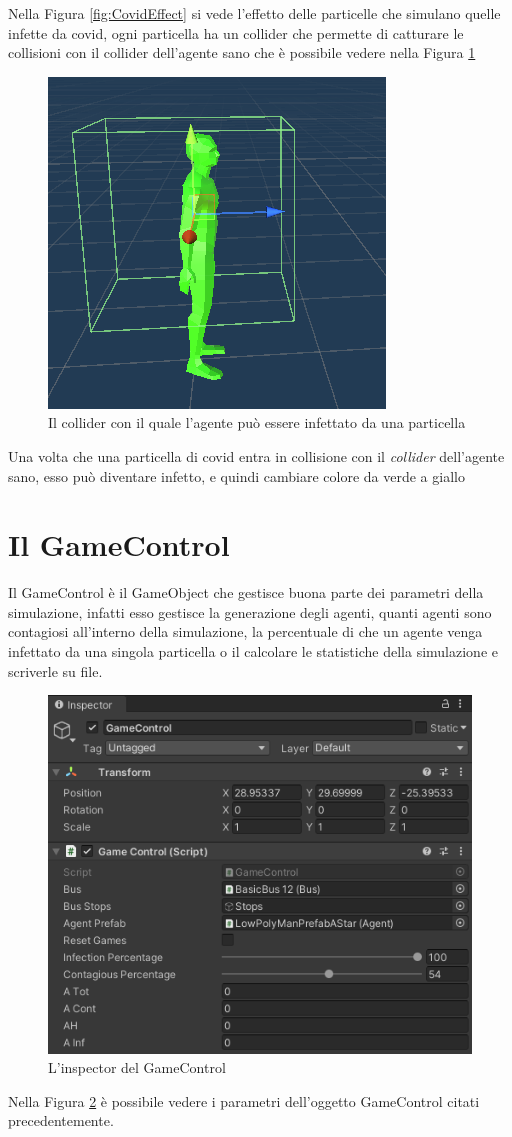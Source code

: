 \documentclass[12pt, openany]{book}
\begin{document}
 	Nella Figura \ref{fig:CovidEffect} si vede l'effetto delle particelle che simulano quelle infette da covid, ogni particella ha un collider che permette di catturare le collisioni con il collider dell'agente sano che è possibile vedere nella Figura \ref{fig:ColliderCovid}
 	\begin{figure}[H]
 		\centering
 		\includegraphics[width=0.5\linewidth]{"Immagini/ColliderCovid.png"}
 		\caption{Il collider con il quale l'agente può essere infettato da una particella}
 		\label{fig:ColliderCovid}
 	\end{figure}
 	Una volta che una particella di covid entra in collisione con il \emph{collider} dell'agente sano, esso può diventare infetto, e quindi cambiare colore da verde a giallo
 	\section{Il GameControl}
 		Il GameControl è il GameObject che gestisce buona parte dei parametri della simulazione,  infatti esso gestisce la generazione degli agenti, quanti agenti sono contagiosi all'interno della simulazione, la percentuale di che un agente venga infettato da una singola particella o il calcolare le statistiche della simulazione e scriverle su file.
 		\begin{figure}[H]
 			\centering
 			\includegraphics[width=1\linewidth]{"Immagini/GameControl.png"}
 			\caption{L'inspector del GameControl}
 			\label{fig:GameControl}
 		\end{figure}
 		Nella Figura \ref{fig:GameControl} è possibile vedere i parametri dell'oggetto GameControl citati precedentemente.
\end{document}

